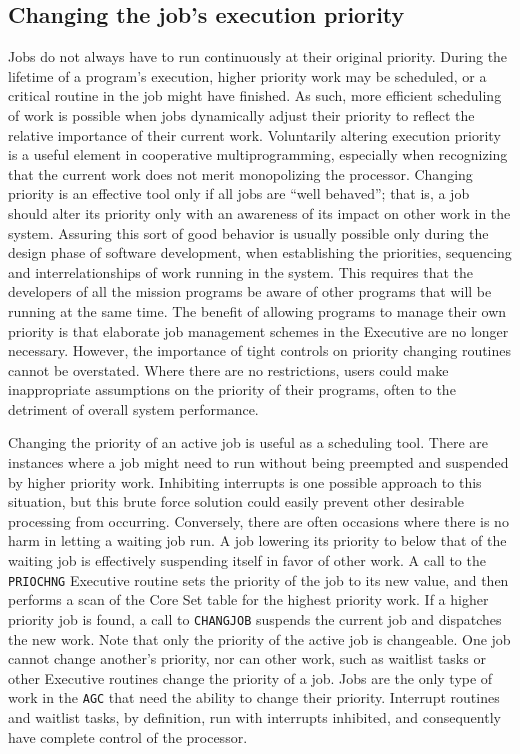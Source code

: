 \documentclass[refcap, oxford]{ahsan}
\begin{document}
\subsection{Changing the job's execution priority}
Jobs do not always have to run continuously at their original priority. During the lifetime of a program's execution, higher priority work may be scheduled, or a critical routine in the job might have finished. As such, more efficient scheduling of work is possible when jobs dynamically adjust their priority to reflect the relative importance of their current work. Voluntarily altering execution priority is a useful element in cooperative multiprogramming, especially when recognizing that the current work does not merit monopolizing the processor. Changing priority is an effective tool only if all jobs are ``well behaved''; that is, a job should alter its priority only with an awareness of its impact on other work in the system. Assuring this sort of good behavior is usually possible only during the design phase of software development, when establishing the priorities, sequencing and interrelationships of work running in the system. This requires that the developers of all the mission programs be aware of other programs that will be running at the same time. The benefit of allowing programs to manage their own priority is that elaborate job management schemes in the Executive are no longer necessary. However, the importance of tight controls on priority changing routines cannot be overstated. Where there are no restrictions, users could make inappropriate assumptions on the priority of their programs, often to the detriment of overall system performance.

Changing the priority of an active job is useful as a scheduling tool. There are instances where a job might need to run without being preempted and suspended by higher priority work. Inhibiting interrupts is one possible approach to this situation, but this brute force solution could easily prevent other desirable processing from occurring. Conversely, there are often occasions where there is no harm in letting a waiting job run. A job lowering its priority to below that of the waiting job is effectively suspending itself in favor of other work. A call to the \texttt{PRIOCHNG} Executive routine sets the priority of the job to its new value, and then performs a scan of the Core Set table for the highest priority work. If a higher priority job is found, a call to \texttt{CHANGJOB} suspends the current job and dispatches the new work. Note that only the priority of the active job is changeable. One job cannot change another's priority, nor can other work, such as waitlist tasks or other Executive routines change the priority of a job. Jobs are the only type of work in the \texttt{AGC} that need the ability to change their priority. Interrupt routines and waitlist tasks, by definition, run with interrupts inhibited, and consequently have complete control of the processor.
\end{document}
